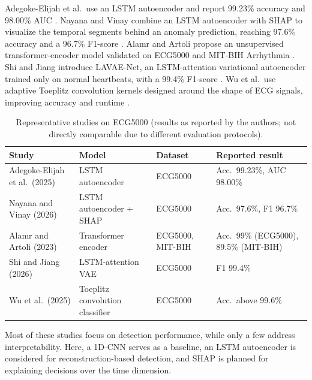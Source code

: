 \documentclass[conference]{IEEEtran}
\begin{document}
Adegoke-Elijah et al.\ use an LSTM autoencoder and report 99.23\% accuracy and 98.00\% AUC \citep{adegoke2025}. Nayana and Vinay combine an LSTM autoencoder with SHAP to visualize the temporal segments behind an anomaly prediction, reaching 97.6\% accuracy and a 96.7\% F1-score \citep{nayana2026}. Alamr and Artoli propose an unsupervised transformer-encoder model validated on ECG5000 and MIT-BIH Arrhythmia \citep{alamr2023}. Shi and Jiang introduce LAVAE-Net, an LSTM-attention variational autoencoder trained only on normal heartbeats, with a 99.4\% F1-score \citep{shi2026}. Wu et al.\ use adaptive Toeplitz convolution kernels designed around the shape of ECG signals, improving accuracy and runtime \citep{wu2025}.

\begin{table}[H]
    \centering
    \caption{Representative studies on ECG5000 (results as reported by the authors; not directly comparable due to different evaluation protocols).}
    \label{tab:related-work}
    \scriptsize
    \setlength{\tabcolsep}{3pt}
    \begin{tabular}{>{\raggedright\arraybackslash}p{1.75cm}>{\raggedright\arraybackslash}p{2.05cm}>{\raggedright\arraybackslash}p{1.4cm}>{\raggedright\arraybackslash}p{2.15cm}}
        \toprule
        \textbf{Study} & \textbf{Model} & \textbf{Dataset} & \textbf{Reported result} \\
        \midrule
        Adegoke-Elijah et al.\ (2025) & LSTM autoencoder & ECG5000 & Acc.\ 99.23\%, AUC 98.00\% \\
        Nayana and Vinay (2026) & LSTM autoencoder + SHAP & ECG5000 & Acc.\ 97.6\%, F1 96.7\% \\
        Alamr and Artoli (2023) & Transformer encoder & ECG5000, MIT-BIH & Acc.\ 99\% (ECG5000), 89.5\% (MIT-BIH) \\
        Shi and Jiang (2026) & LSTM-attention VAE & ECG5000 & F1 99.4\% \\
        Wu et al.\ (2025) & Toeplitz convolution classifier & ECG5000 & Acc.\ above 99.6\% \\
        \bottomrule
    \end{tabular}
\end{table}

Most of these studies focus on detection performance, while only a few address interpretability. Here, a 1D-CNN serves as a baseline, an LSTM autoencoder is considered for reconstruction-based detection, and SHAP is planned for explaining decisions over the time dimension.
\end{document}
